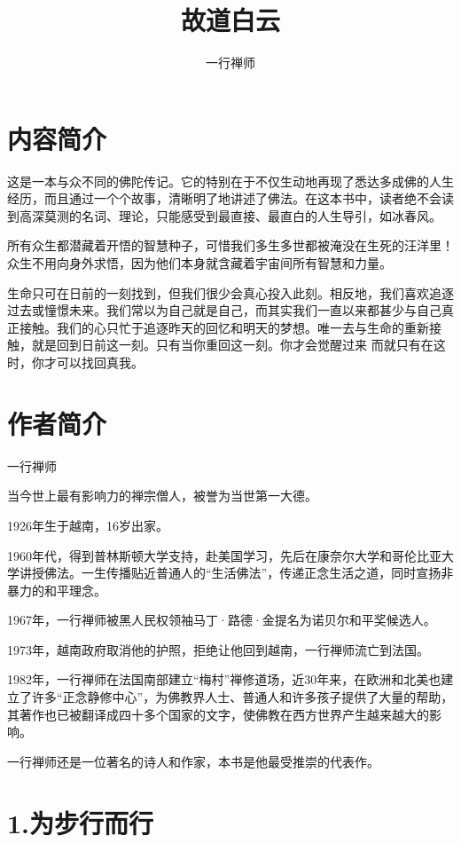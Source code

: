\documentclass[12pt,twoside,openany]{book}
\title{故道白云}
\author{一行禅师}
\date{}
\begin{document}

\maketitle
\tableofcontents

\noindent
\chapter*{内容简介}
这是一本与众不同的佛陀传记。它的特别在于不仅生动地再现了悉达多成佛的人生经历，而且通过一个个故事，清晰明了地讲述了佛法。在这本书中，读者绝不会读到高深莫测的名词、理论，只能感受到最直接、最直白的人生导引，如冰春风。 

所有众生都潜藏着开悟的智慧种子，可惜我们多生多世都被淹没在生死的汪洋里！众生不用向身外求悟，因为他们本身就含藏着宇宙间所有智慧和力量。 

生命只可在日前的一刻找到，但我们很少会真心投入此刻。相反地，我们喜欢追逐过去或憧憬未来。我们常以为自己就是自己，而其实我们一直以来都甚少与自己真正接触。我们的心只忙于追逐昨天的回忆和明天的梦想。唯一去与生命的重新接触，就是回到日前这一刻。只有当你重回这一刻。你才会觉醒过来 而就只有在这时，你才可以找回真我。 

\chapter*{作者简介}
一行禅师

当今世上最有影响力的禅宗僧人，被誉为当世第一大德。

1926年生于越南，16岁出家。

1960年代，得到普林斯顿大学支持，赴美国学习，先后在康奈尔大学和哥伦比亚大学讲授佛法。一生传播贴近普通人的“生活佛法”，传递正念生活之道，同时宣扬非暴力的和平理念。

1967年，一行禅师被黑人民权领袖马丁·路德·金提名为诺贝尔和平奖候选人。

1973年，越南政府取消他的护照，拒绝让他回到越南，一行禅师流亡到法国。

1982年，一行禅师在法国南部建立“梅村”禅修道场，近30年来，在欧洲和北美也建立了许多“正念静修中心”，为佛教界人士、普通人和许多孩子提供了大量的帮助，其著作也已被翻译成四十多个国家的文字，使佛教在西方世界产生越来越大的影响。

一行禅师还是一位著名的诗人和作家，本书是他最受推崇的代表作。

\chapter{1.为步行而行}\label{ch1}
\end{document}
